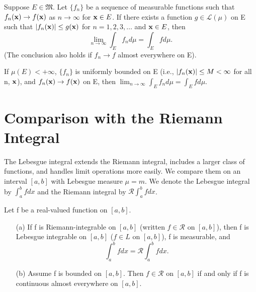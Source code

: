 \begin{theorem}
  \label{thm:chap11:dominated_convergence}
  Suppose $E \in \mathfrak{M}$. Let $\{ f_n \}$ be a sequence of
  measurable functions such that $f_n(\mathbf{x}) \to f(\mathbf{x})$ as
  $n \to \infty$ for $\mathbf{x} \in E$. If there exists a function $g
  \in \mathcal{L}(\mu)$ on E such that $|f_n(\mathbf{x})| \le
  g(\mathbf{x})$ for $n=1, 2, 3, \dots$ and $\mathbf{x} \in E$, then
  \[
    \lim_{n \to \infty} \int_E f_n d\mu = \int_E f d\mu.
  \]
  (The conclusion also holds if $f_n \to f$ almost everywhere on E).
\end{theorem}

\begin{corollary}
  \label{cor:chap11:bounded_convergence}
  If $\mu(E) < +\infty$, $\{ f_n \}$ is uniformly bounded on E (i.e.,
  $|f_n(\mathbf{x})| \le M < \infty$ for all n, $\mathbf{x}$), and
  $f_n(\mathbf{x}) \to f(\mathbf{x})$ on E, then $\lim_{n \to \infty}
  \int_E f_n d\mu = \int_E f d\mu$.
\end{corollary}



\section{Comparison with the Riemann Integral}

The Lebesgue integral extends the Riemann integral, includes a larger
class of functions, and handles limit operations more easily. We
compare them on an interval $[a, b]$ with Lebesgue measure $\mu=m$.
We denote the Lebesgue integral by $\int_a^b f dx$ and the Riemann
integral by $\mathcal{R}\int_a^b f dx$.

\begin{theorem}
  \label{thm:chap11:riemann_vs_lebesgue}
  Let f be a real-valued function on $[a, b]$.
  \begin{itemize}
    \item[(a)] If f is Riemann-integrable on $[a, b]$ (written $f \in
      \mathcal{R}$ on $[a, b]$), then f is Lebesgue integrable on
      $[a, b]$ ($f \in L$ on $[a, b]$), f is measurable, and
      \[
        \int_a^b f dx = \mathcal{R}\int_a^b f dx.
      \]
    \item[(b)] Assume f is bounded on $[a, b]$. Then $f \in
      \mathcal{R}$ on $[a, b]$ if and only if f is continuous almost
      everywhere on $[a, b]$.
  \end{itemize}
\end{theorem}

